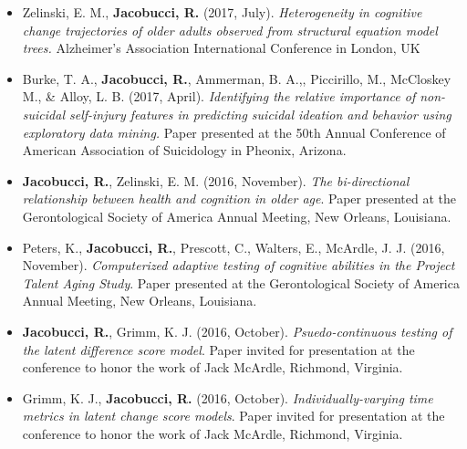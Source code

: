 \documentclass[letterpaper,10pt]{article}
\begin{document}
\begin{itemize}
	\item[] Zelinski, E. M., \textbf{Jacobucci, R.} (2017, July). \emph{Heterogeneity in cognitive change trajectories of older adults observed from structural equation model trees.} Alzheimer’s Association International Conference in London, UK
	\item[]Burke, T. A., \textbf{Jacobucci, R.}, Ammerman, B. A.,, Piccirillo, M., McCloskey M., \& Alloy, L. B. (2017, April). \textit{Identifying the relative importance of non-suicidal self-injury features in predicting suicidal ideation and behavior using exploratory data mining.} Paper presented at the 50th Annual Conference of American Association of Suicidology in Pheonix, Arizona.
	
	\item[] \textbf{Jacobucci, R.}, Zelinski, E. M. (2016, November). \emph{The bi-directional relationship between health and cognition in older age}. Paper presented at the Gerontological Society of America Annual Meeting, New Orleans, Louisiana.
	
	\item[] Peters, K., \textbf{Jacobucci, R.}, Prescott, C., Walters, E., McArdle, J. J. (2016, November). \emph{Computerized adaptive testing of cognitive abilities in the Project Talent Aging Study}. Paper presented at the Gerontological Society of America Annual Meeting, New Orleans, Louisiana.
	
	\item[] \textbf{Jacobucci, R.}, Grimm, K. J. (2016, October). \emph{Psuedo-continuous testing of the latent difference score model}. Paper invited for presentation at the conference to honor the work of Jack McArdle, Richmond, Virginia.
	\item[] Grimm, K. J., \textbf{Jacobucci, R.} (2016, October). \emph{ Individually-varying time metrics in latent change score models}. Paper invited for presentation at the conference to honor the work of Jack McArdle, Richmond, Virginia.
	

\end{itemize}
\end{document}
